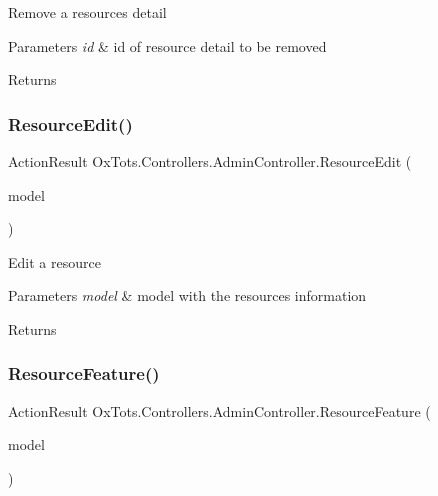 Remove a resource\textquotesingle{}s detail 


\begin{DoxyParams}{Parameters}
{\em id} & id of resource detail to be removed\\
\hline
\end{DoxyParams}
\begin{DoxyReturn}{Returns}

\end{DoxyReturn}
\mbox{\label{class_ox_tots_1_1_controllers_1_1_admin_controller_a987f062c86e60140596a7941670d3995}} 
\subsubsection{\texorpdfstring{ResourceEdit()}{ResourceEdit()}}
{\footnotesize\ttfamily Action\+Result Ox\+Tots.\+Controllers.\+Admin\+Controller.\+Resource\+Edit (\begin{DoxyParamCaption}\item[{Admin\+Resource\+View\+Model}]{model }\end{DoxyParamCaption})\hspace{0.3cm}{\ttfamily [inline]}}



Edit a resource 


\begin{DoxyParams}{Parameters}
{\em model} & model with the resource\textquotesingle{}s information\\
\hline
\end{DoxyParams}
\begin{DoxyReturn}{Returns}

\end{DoxyReturn}
\mbox{\label{class_ox_tots_1_1_controllers_1_1_admin_controller_a4cdef49790ac2650df4ba4d4a8421852}} 
\subsubsection{\texorpdfstring{ResourceFeature()}{ResourceFeature()}}
{\footnotesize\ttfamily Action\+Result Ox\+Tots.\+Controllers.\+Admin\+Controller.\+Resource\+Feature (\begin{DoxyParamCaption}\item[{Admin\+Resource\+View\+Model}]{model }\end{DoxyParamCaption})\hspace{0.3cm}{\ttfamily [inline]}}



